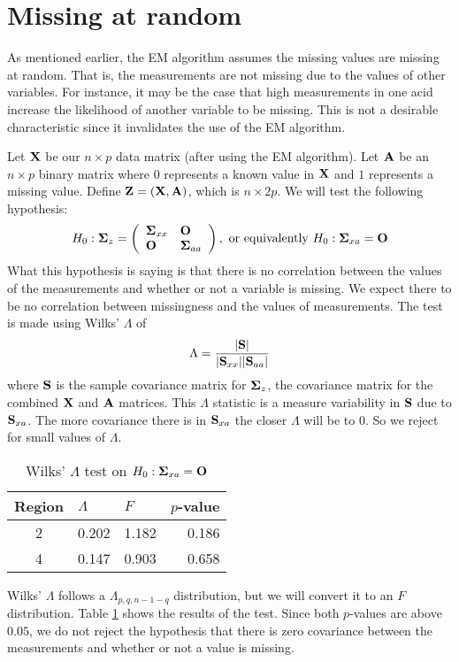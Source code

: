\section{Missing at random}

As mentioned earlier, the EM algorithm assumes the missing values are missing at random. That is, the measurements are not missing due to the values of other variables. For instance, it may be the case that high measurements in one acid increase the likelihood of another variable to be missing. This is not a desirable characteristic since it invalidates the use of the EM algorithm.

Let $\mathbf{\bm{X}}$ be our $n\times p$ data matrix (after using the EM algorithm). Let $\mathbf{\bm{A}}$ be an $n\times p$ binary matrix where $0$ represents a known value in $\mathbf{\bm{X}}$ and $1$ represents a missing value. Define $\mathbf{\bm{Z}} = (\mathbf{\bm{X}}, \mathbf{\bm{A}})$, which is $n\times 2p$. We will test the following hypothesis:
\[H_0:\mathbf{\bm{\Sigma}}_z = \left(\begin{array}{ll} \mathbf{\bm{\Sigma}}_{xx} & \mathbf{\bm{O}} \\ \mathbf{\bm{O}} & \mathbf{\bm{\Sigma}}_{aa} \end{array}\right),~\mathrm{or~equivalently}~H_0:\mathbf{\bm{\Sigma}}_{xa}=\mathbf{\bm{O}}\]
What this hypothesis is saying is that there is no correlation between the values of the measurements and whether or not a variable is missing. We expect there to be no correlation between missingness and the values of measurements. The test is made using Wilks' $\Lambda$ of
\[\Lambda=\frac{|\mathbf{\bm{S}}|}{|\mathbf{\bm{S}}_{xx}||\mathbf{\bm{S}}_{aa}|}\]
where $\mathbf{\bm{S}}$ is the sample covariance matrix for $\mathbf{\bm{\Sigma}}_z$, the covariance matrix for the combined $\mathbf{\bm{X}}$ and $\mathbf{\bm{A}}$ matrices. This $\Lambda$ statistic is a measure variability in $\mathbf{\bm{S}}$ due to $\mathbf{\bm{S}}_{xa}$. The more covariance there is in $\mathbf{\bm{S}}_{xa}$ the closer $\Lambda$ will be to $0$. So we reject for small values of $\Lambda$.

\begin{table}
\begin{center}
\begin{tabular}{c | rrr}
Region & \multicolumn{1}{l}{$\Lambda$}  & \multicolumn{1}{l}{$F$}    & \multicolumn{1}{l}{$p$-value} \\ \hline \hline
     2 & 0.202 & 1.182  & 0.186     \\
     4 & 0.147 & 0.903  & 0.658     \\
\end{tabular}
\caption{Wilks' $\Lambda$ test on $H_0:\mathbf{\bm{\Sigma}}_{xa}=\mathbf{\bm{O}}$}
\label{missing}
\end{center}
\end{table}

Wilks' $\Lambda$ follows a $\Lambda_{p,q,n-1-q}$ distribution, but we will convert it to an $F$ distribution. Table \ref{missing} shows the results of the test. Since both $p$-values are above $0.05$, we do not reject the hypothesis that there is zero covariance between the measurements and whether or not a value is missing.
